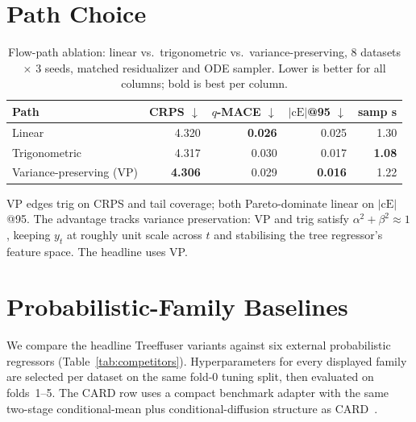 \documentclass{uai2026}
\begin{document}
\section{Path Choice}\label{app:path}

\begin{table}[!h]
  \centering
  \caption{Flow-path ablation: linear vs.\ trigonometric vs.\ variance-preserving, 8 datasets $\times$ 3 seeds, matched residualizer and ODE sampler. Lower is better for all columns; bold is best per column.}\label{tab:path}
  \footnotesize
  \begin{tabular}{lrrrr}
    \toprule
    Path & CRPS $\downarrow$ & $q$-MACE $\downarrow$ & $|\text{cE}|$@95 $\downarrow$ & samp s \\
    \midrule
    Linear         & 4.320 & \textbf{0.026} & 0.025 & 1.30 \\
    Trigonometric  & 4.317 & 0.030 & 0.017 & \textbf{1.08} \\
    Variance-preserving (VP) & \textbf{4.306} & 0.029 & \textbf{0.016} & 1.22 \\
    \bottomrule
  \end{tabular}
\end{table}

VP edges trig on CRPS and tail coverage; both Pareto-dominate linear on $|\text{cE}|$@95. The advantage tracks variance preservation: VP and trig satisfy $\alpha^2+\beta^2 \approx 1$, keeping $y_t$ at roughly unit scale across $t$ and stabilising the tree regressor's feature space. The headline uses VP.

\section{Probabilistic-Family Baselines}\label{app:competitors}

We compare the headline Treeffuser variants against six external probabilistic regressors (Table~\ref{tab:competitors}). Hyperparameters for every displayed family are selected per dataset on the same fold-0 tuning split, then evaluated on folds~1--5. The CARD row uses a compact benchmark adapter with the same two-stage conditional-mean plus conditional-diffusion structure as CARD~\citep{han2022card}.
\end{document}
